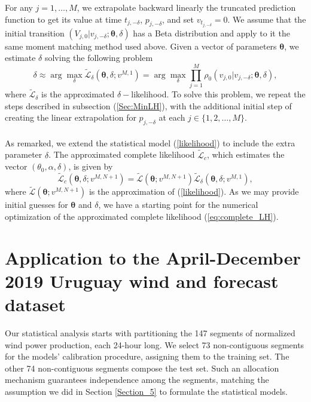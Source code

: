 \documentclass[11pt]{article}
\theoremstyle{definition}
\begin{document}
For any $j=1, \ldots, M$, we extrapolate backward linearly the truncated prediction function to get its value at time $t_{j,-\delta}$, $p_{j,-\delta}$, and set $v_{t_{j,-\delta}}=0$. We assume that the initial transition $(V_{j, 0}|v_{j,-\delta};\bm{\theta},\delta)$ 
has a Beta distribution and apply to it the same moment matching method used above. Given a vector of parameters $\bm{\theta}$, we estimate $\delta$ solving the following problem
\begin{equation}
\delta\approx\arg\max_{\delta}\tilde{\mathcal{L}}_{\delta}\left(\bm{\theta},\delta; v^{M,1}\right) = \arg\max_{\delta}\prod\limits_{j=1}^M \rho_0 \left(v_{j, 0}|v_{j,-\delta};\bm{\theta},\delta\right),
\label{eq:likelihood_delta}
\end{equation}
where $\tilde{\mathcal{L}}_\delta$ is the approximated $\delta-$likelihood. To solve this problem, we repeat the steps described in subsection (\ref{Sec:MinLH}), with the additional initial step of creating the linear extrapolation for $p_{j,-\delta}$ at each $j\in\{1,2,\dots,M\}$.\\
\quad\\
As remarked, we extend the statistical model (\ref{likelihood}) to include the extra parameter $\delta$. The approximated complete likelihood $\tilde{\mathcal{L}}_c$, which estimates the vector $(\theta_0,\alpha,\delta)$, is given by
\begin{equation}
\tilde{\mathcal{L}}_c\left(\bm{\theta},\delta; v^{M,N +1}\right)=\tilde{\mathcal{L}}\left(\bm{\theta}; v^{M,N +1}\right)\tilde{\mathcal{L}}_{\delta}\left(\bm{\theta},\delta; v^{M,1}\right),
\label{eq:complete_LH}
\end{equation}
where $\tilde{\mathcal{L}}\left(\bm{\theta}; v^{M,N +1}\right)$ is the approximation of (\ref{likelihood}). As we may provide initial guesses for $\bm{\theta}$ and $\delta$, we have a starting point for the numerical optimization of the approximated complete likelihood (\ref{eq:complete_LH}).



\section{Application to the April-December 2019 Uruguay wind and forecast dataset} \label{Section_6}

Our statistical analysis starts with partitioning the 147 segments of normalized wind power production, each 24-hour long. We select 73 non-contiguous segments for the models' calibration procedure, assigning them to the training set. The other 74 non-contiguous segments compose the test set. Such an allocation mechanism guarantees independence among the segments, matching the assumption we did in Section \ref{Section_5} to formulate the statistical models.
\end{document}

